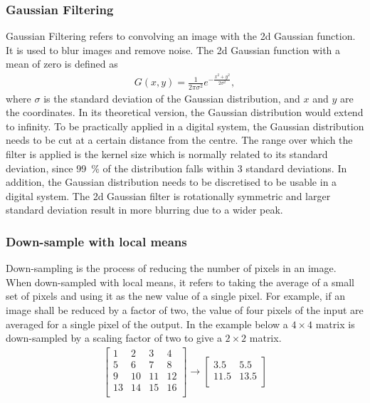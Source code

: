 \subsubsection{Gaussian Filtering} \label{sec:t_gauss}
Gaussian Filtering refers to convolving an image with the \gls{2d} Gaussian function. It is used to blur images and remove noise. The \gls{2d} Gaussian function with a mean of zero is defined as
\begin{align}
    G(x,y) = \frac{1}{2\pi \sigma^{2}}e^{-\frac{x^2+y^2}{2\sigma^2}}, \label{eq:gauss_2d}
\end{align}
where $\sigma$ is the standard deviation of the Gaussian distribution, and $x$ and $y$ are the coordinates.
In its theoretical version, the Gaussian distribution would extend to infinity. To be practically applied in a digital system, the Gaussian distribution needs to be cut at a certain distance from the centre. The range over which the filter is applied is the kernel size which is normally related to its standard deviation, since \SI{99}{\percent} of the distribution falls within 3 standard deviations. In addition, the Gaussian distribution needs to be discretised to be usable in a digital system. The \gls{2d} Gaussian filter is rotationally symmetric and larger standard deviation result in more blurring due to a wider peak.

\subsubsection{Down-sample with local means} \label{sec:t_downsample}
Down-sampling is the process of reducing the number of pixels in an image. When down-sampled with local means, it refers to taking the average of a small set of pixels and using it as the new value of a single pixel. For example, if an image shall be reduced by a factor of two, the value of four pixels of the input are averaged for a single pixel of the output. In the example below a $4\times4$ matrix is down-sampled by a scaling factor of two to give a $2\times2$ matrix.
\begin{align*}
    \begin{bmatrix}
        1  & 2  & 3  & 4\\
        5  & 6  & 7  & 8\\
        9  & 10 & 11 & 12\\
        13 & 14 & 15 & 16\\
    \end{bmatrix} 
    \rightarrow 
    \begin{bmatrix}
        3.5  & 5.5\\
        11.5 & 13.5\\ 
    \end{bmatrix}
\end{align*}
